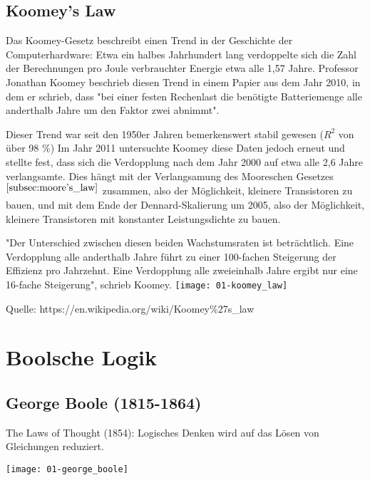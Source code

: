 \documentclass[../main.tex]{subfiles}
\begin{document}
\subsection{Koomey's Law}
\label{subsec:koomey's_law}
\begin{koomey_law}{}
  Das Koomey-Gesetz beschreibt einen Trend in der Geschichte der Computerhardware: Etwa ein halbes Jahrhundert 
  lang verdoppelte sich die Zahl der Berechnungen pro Joule verbrauchter Energie etwa alle 1,57 Jahre. 
  Professor Jonathan Koomey beschrieb diesen Trend in einem Papier aus dem Jahr 2010, in dem er schrieb, 
  dass "bei einer festen Rechenlast die benötigte Batteriemenge alle anderthalb Jahre um den Faktor zwei abnimmt".

  Dieser Trend war seit den 1950er Jahren bemerkenswert stabil gewesen ($R^2$ von über 98 \%)
  Im Jahr 2011 untersuchte Koomey diese Daten jedoch erneut und stellte fest, dass sich die Verdopplung nach dem Jahr 2000 
  auf etwa alle 2,6 Jahre verlangsamte. Dies hängt mit der Verlangsamung des Mooreschen Gesetzes$^{\ref{subsec:moore's_law}}$ 
  zusammen, also der Möglichkeit, kleinere Transistoren zu bauen, und mit dem Ende der Dennard-Skalierung um 2005, 
  also der Möglichkeit, kleinere Transistoren mit konstanter Leistungsdichte zu bauen.

  "Der Unterschied zwischen diesen beiden Wachstumsraten ist beträchtlich. Eine Verdopplung alle anderthalb 
  Jahre führt zu einer 100-fachen Steigerung der Effizienz pro Jahrzehnt. Eine Verdopplung alle zweieinhalb 
  Jahre ergibt nur eine 16-fache Steigerung", schrieb Koomey.
  \newline
  \texttt{[image: 01-koomey\_law]}
\end{koomey_law}
Quelle: https://en.wikipedia.org/wiki/Koomey\%27s\_law
\section{Boolsche Logik}
\subsection{George Boole (1815-1864)}
The Laws of Thought (1854):\newline
Logisches Denken wird auf das Lösen von Gleichungen reduziert.\newline
\begin{flushright}
  \texttt{[image: 01-george\_boole]}
 \end{flushright}
\end{document}
